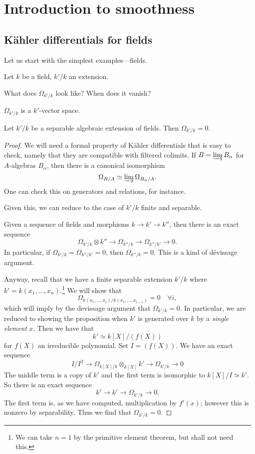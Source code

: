 \section{Introduction to smoothness}
\subsection{K\"ahler differentials for fields}

Let us start with the simplest examples---fields.

\begin{example} 
Let $k$ be a field, $k'/k$ an extension. 
\begin{question} 
What does $\Omega_{k'/k}$ look like? When does it vanish?
\end{question} 
$\Omega_{k'/k}$ is a $k'$-vector space.

\begin{proposition} 
Let $k'/k$ be a separable algebraic extension of fields. Then $\Omega_{k'/k} = 0$.
\end{proposition} 
\begin{proof} 
We will need a formal property of K\"ahler differentials that is easy to check,
namely that they are compatible with filtered colimits. If $B = \varinjlim
B_\alpha$ for $A$-algebras $B_\alpha$, then there is a canonical isomorphism
\[ \Omega_{B/A} \simeq \varinjlim \Omega_{B_{\alpha}/A}.  \]
One can check this on generators and relations, for instance.

Given this, we can reduce to the case of $k'/k$ finite and separable. 
\begin{remark} 
Given a sequence of fields and morphisms $k \to k' \to k''$, then there is an
exact sequence
\[ \Omega_{k'/k} \otimes k'' \to \Omega_{k''/k} \to \Omega_{k''/k'} \to 0.  \]
In particular, if $\Omega_{k'/k} = \Omega_{k''/k'} =0 $, then $\Omega_{k''/k} =
0$. This is a kind of d\'evissage argument.
\end{remark} 

Anyway, recall that we have a finite separable extension $k'/k$ where $k' =
k(x_1, \dots, x_n)$.\footnote{We can take $n=1$ by the primitive element
theorem, but shall not need this.} We will show that
\[ \Omega_{k(x_1, \dots, x_i)/k(x_1, \dots, x_{i-1})} =0 \quad \forall i,  \]
which will imply by the devissage argument that $\Omega_{k'/k} = 0$.
In particular, we are reduced to showing the proposition when $k'$ is generated
over $k$ by a \emph{single element} $x$. Then we have that
\[ k' \simeq k[X]/(f(X))  \]
for $f(X)$ an irreducible polynomial. Set $I = (f(X))$. We have an exact sequence
\[ I/I^2 \to \Omega_{k[X]/k} \otimes_{k[X]} k' \to \Omega_{k'/k} \to 0 \]
The middle term is a copy of $k'$ and the first term is isomorphic to $k[X]/I
\simeq k'$. So there is an exact sequence
\[ k' \to k' \to \Omega_{k'/k} \to 0.  \]
The first term is, as we have computed, multiplication by $f'(x)$; however
this is nonzero by separability. Thus we find that $\Omega_{k'/k} =0$.
\end{proof} 
\end{example} 

